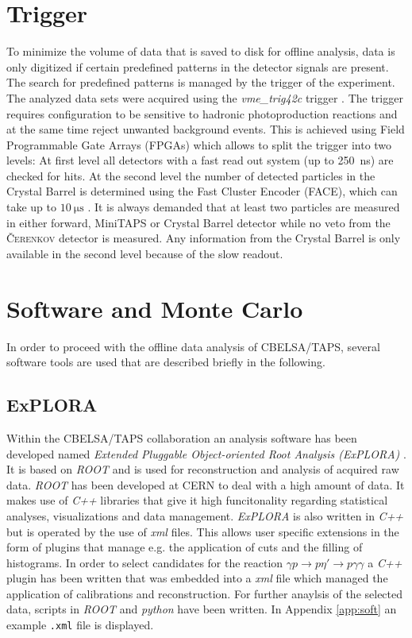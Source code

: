 \section{Trigger}
\label{sec:trig}
To minimize the volume of data that is saved to disk for offline analysis, data is only digitized if certain predefined patterns in the detector signals are present. The search for predefined patterns is managed by the trigger of the experiment. The analyzed data sets were acquired using the \emph{vme\_trig42c} trigger \cite{trig1,trig2}. The trigger requires configuration to be sensitive to hadronic photoproduction reactions and at the same time reject unwanted background events. This is achieved using Field Programmable Gate Arrays (FPGAs) which allows to split the trigger into two levels: At first level all detectors with a fast read out system (up to \SI{250}{\nano\s}) are checked for hits. At the second level the number of detected particles in the Crystal Barrel is determined using the Fast Cluster Encoder (FACE), which can take up to $\SI{10}{\micro\s}$ \cite{face}. It is always demanded that at least two particles are measured in either forward, MiniTAPS or Crystal Barrel detector while no veto from the \textsc{\v Cerenkov} detector is measured. Any information from the Crystal Barrel is only available in the second level because of the slow readout.
\section{Software and Monte Carlo}
\label{sec:mc}
In order to proceed with the offline data analysis of CBELSA/TAPS, several software tools are used that are described briefly in the following.
\subsection{ExPLORA}
Within the CBELSA/TAPS collaboration an analysis software has been developed named \emph{Extended Pluggable Object-oriented Root Analysis (ExPLORA)} \cite{explora}. It is based on \emph{ROOT} \cite{root} and is used for reconstruction and analysis of acquired raw data. \emph{ROOT} has been developed at CERN to deal with a high amount of data. It makes use of \emph{C++} libraries that give it high funcitonality regarding statistical analyses, visualizations and data management. \emph{ExPLORA} is also written in \emph{C++} but is operated by the use of \emph{xml} files. This allows user specific extensions in the form of plugins that manage e.g. the application of cuts and the filling of histograms. In order to select candidates for the reaction $\gamma p\to p\eta'\to p\gamma\gamma$ a \emph{C++} plugin has been written that was embedded into a \emph{xml} file which managed the application of calibrations and reconstruction. For further anaylsis of the selected data, scripts in \emph{ROOT} and \emph{python} have been written. In Appendix \ref{app:soft} an example \texttt{.xml} file is displayed.

